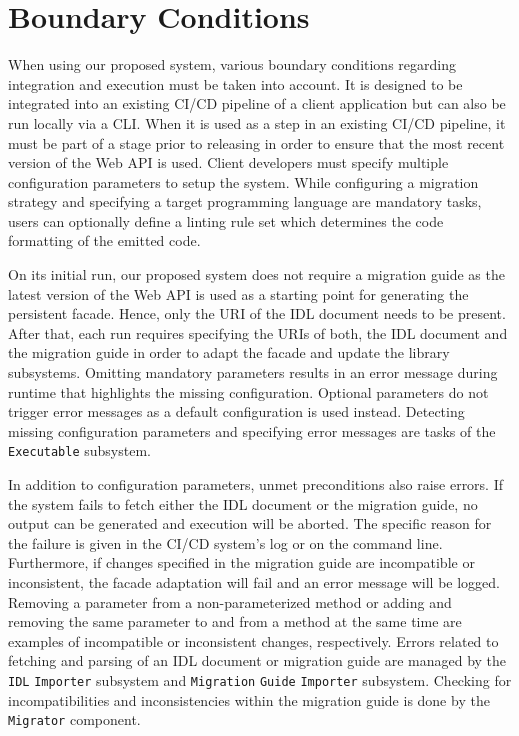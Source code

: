 \section{Boundary Conditions}
\label{sec:BoundaryConditions}

When using our proposed system, various boundary conditions regarding integration and execution must be taken into account. It is designed to be integrated into an existing CI/CD pipeline of a client application but can also be run locally via a CLI. When it is used as a step in an existing CI/CD pipeline, it must be part of a stage prior to releasing in order to ensure that the most recent version of the Web API is used. Client developers must specify multiple configuration parameters to setup the system. While configuring a migration strategy and specifying a target programming language are mandatory tasks, users can optionally define a linting rule set which determines the code formatting of the emitted code. 

On its initial run, our proposed system does not require a migration guide as the latest version of the Web API is used as a starting point for generating the persistent facade. Hence, only the \ac{URI} of the IDL document needs to be present. After that, each run requires specifying the \acp{URI} of both, the IDL document and the migration guide in order to adapt the facade and update the library subsystems. Omitting mandatory parameters results in an error message during runtime that highlights the missing configuration. Optional parameters do not trigger error messages as a default configuration is used instead. Detecting missing configuration parameters and specifying error messages are tasks of the \texttt{Executable} subsystem.

In addition to configuration parameters, unmet preconditions also raise errors. If the system fails to fetch either the IDL document or the migration guide, no output can be generated and execution will be aborted. The specific reason for the failure is given in the CI/CD system's log or on the command line. Furthermore, if changes specified in the migration guide are incompatible or inconsistent, the facade adaptation will fail and an error message will be logged. Removing a parameter from a non-parameterized method or adding and removing the same parameter to and from a method at the same time are examples of incompatible or inconsistent changes, respectively. Errors related to fetching and parsing of an IDL document or migration guide are managed by the \texttt{IDL} \texttt{Importer} subsystem and \texttt{Migration} \texttt{Guide} \texttt{Importer} subsystem. Checking for incompatibilities and inconsistencies within the migration guide is done by the \texttt{Migrator} component.



